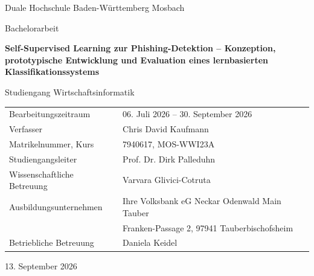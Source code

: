 \begin{titlepage}
\centering
{\large Duale Hochschule Baden-Württemberg Mosbach\par}
\vspace{1cm}
{\Large Bachelorarbeit\par}
\vspace{1cm}
{\LARGE\bfseries Self-Supervised Learning zur Phishing-Detektion -- Konzeption, prototypische Entwicklung und Evaluation eines lernbasierten Klassifikationssystems\par}
\vspace{1cm}
{\large Studiengang Wirtschaftsinformatik\par}
\vfill
\begin{tabularx}{\textwidth}{@{}p{}X@{}}
Bearbeitungszeitraum & 06. Juli 2026 -- 30. September 2026\\[7pt]
Verfasser & Chris David Kaufmann\\[7pt]
Matrikelnummer, Kurs & 7940617, MOS-WWI23A\\[7pt]
Studiengangsleiter & Prof. Dr. Dirk Palleduhn\\[7pt]
Wissenschaftliche Betreuung & Varvara Glivici-Cotruta\\[7pt]
Ausbildungsunternehmen & Ihre Volksbank eG Neckar Odenwald Main Tauber\\
 & Franken-Passage 2, 97941 Tauberbischofsheim\\[7pt]
Betriebliche Betreuung & Daniela Keidel
\end{tabularx}
\vfill
13. September 2026
\end{titlepage}
